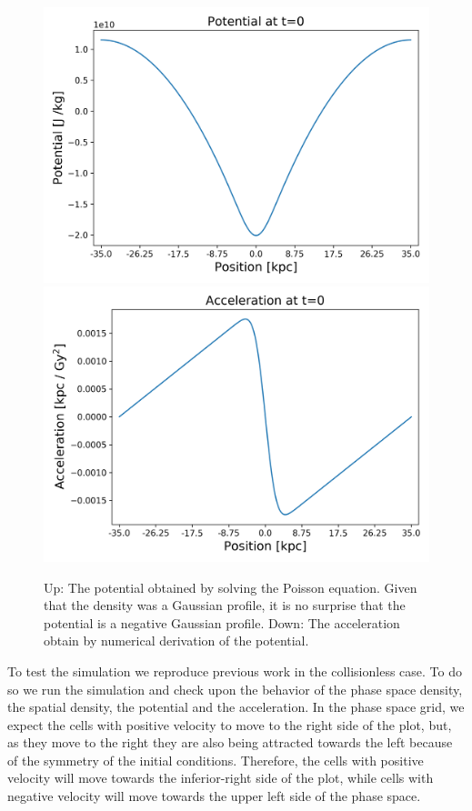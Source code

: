\begin{figure}[h!]
    \centering
    \includegraphics[scale=0.6]{imag/1dInitPot.png}
    \includegraphics[scale=0.6]{imag/1dInitAcce.png}
    \caption{Up: The potential obtained by solving the Poisson equation. Given that the density was a Gaussian profile, it is no surprise that the potential is a negative Gaussian profile. Down: The acceleration obtain by numerical derivation of the potential.}
    \label{1dInit2}
\end{figure}

To test the simulation we reproduce previous work in the collisionless case.
To do so we run the simulation and check upon the behavior of the phase space density, the spatial density, the potential and the acceleration.
In the phase space grid, we expect the cells with positive velocity to move to the right side of the plot, but, as they move to the right they are also being attracted towards the left because of the symmetry of the initial conditions. Therefore, the cells with positive velocity will move towards the inferior-right side of the plot, while cells with negative velocity will move towards the upper left side of the phase space.

